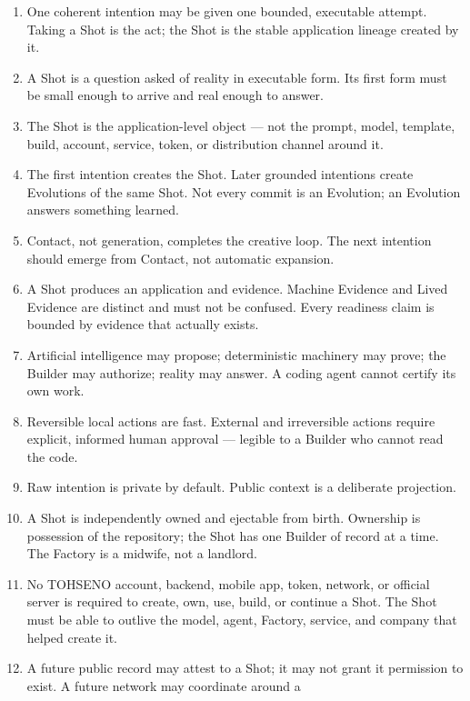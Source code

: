 \documentclass[11pt]{article}
\newcommand{\TOH}{TOHSENO}
\begin{document}
\begin{enumerate}
\item One coherent intention may be given one bounded, executable
      attempt. Taking a Shot is the act; the Shot is the stable
      application lineage created by it.
\item A Shot is a question asked of reality in executable form. Its
      first form must be small enough to arrive and real enough to
      answer.
\item The Shot is the application-level object --- not the prompt,
      model, template, build, account, service, token, or distribution
      channel around it.
\item The first intention creates the Shot. Later grounded intentions
      create Evolutions of the same Shot. Not every commit is an
      Evolution; an Evolution answers something learned.
\item Contact, not generation, completes the creative loop. The next
      intention should emerge from Contact, not automatic expansion.
\item A Shot produces an application and evidence. Machine Evidence and
      Lived Evidence are distinct and must not be confused. Every
      readiness claim is bounded by evidence that actually exists.
\item Artificial intelligence may propose; deterministic machinery may
      prove; the Builder may authorize; reality may answer. A coding
      agent cannot certify its own work.
\item Reversible local actions are fast. External and irreversible
      actions require explicit, informed human approval --- legible to a
      Builder who cannot read the code.
\item Raw intention is private by default. Public context is a
      deliberate projection.
\item A Shot is independently owned and ejectable from birth. Ownership
      is possession of the repository; the Shot has one Builder of
      record at a time. The Factory is a midwife, not a landlord.
\item No \TOH{} account, backend, mobile app, token, network, or
      official server is required to create, own, use, build, or
      continue a Shot. The Shot must be able to outlive the model,
      agent, Factory, service, and company that helped create it.
\item A future public record may attest to a Shot; it may not grant it
      permission to exist. A future network may coordinate around a

\end{enumerate}
\end{document}
